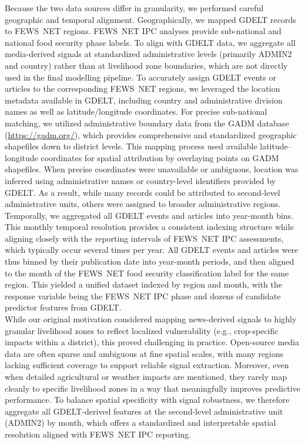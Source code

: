 \documentclass{article}
\begin{document}
Because the two data sources differ in granularity, we performed careful geographic and temporal alignment. Geographically, we mapped GDELT records to FEWS~NET regions. FEWS~NET IPC analyses provide sub-national and national food security phase labels. To align with GDELT data, we aggregate all media-derived signals at standardized administrative levels (primarily ADMIN2 and country) rather than at livelihood zone boundaries, which are not directly used in the final modelling pipeline. To accurately assign GDELT events or articles to the corresponding FEWS~NET regions, we leveraged the location metadata available in GDELT, including country and administrative division names as well as latitude/longitude coordinates. For precise sub-national matching, we utilized administrative boundary data from the GADM database (\url{https://gadm.org/}), which provides comprehensive and standardized geographic shapefiles down to district levels. This mapping process used available latitude–longitude coordinates for spatial attribution by overlaying points on GADM shapefiles. When precise coordinates were unavailable or ambiguous, location was inferred using administrative names or country-level identifiers provided by GDELT. As a result, while many records could be attributed to second-level administrative units, others were assigned to broader administrative regions. Temporally, we aggregated all GDELT events and articles into year-month bins. This monthly temporal resolution provides a consistent indexing structure while aligning closely with the reporting intervals of FEWS~NET IPC assessments, which typically occur several times per year. All GDELT events and articles were thus binned by their publication date into year-month periods, and then aligned to the month of the FEWS~NET food security classification label for the same region. This yielded a unified dataset indexed by region and month, with the response variable being the FEWS~NET IPC phase and dozens of candidate predictor features from GDELT.\\

While our original motivation considered mapping news-derived signals to highly granular livelihood zones to reflect localized vulnerability (e.g., crop-specific impacts within a district), this proved challenging in practice. Open-source media data are often sparse and ambiguous at fine spatial scales, with many regions lacking sufficient coverage to support reliable signal extraction. Moreover, even when detailed agricultural or weather impacts are mentioned, they rarely map cleanly to specific livelihood zones in a way that meaningfully improves predictive performance. To balance spatial specificity with signal robustness, we therefore aggregate all GDELT-derived features at the second-level administrative unit (ADMIN2) by month, which offers a standardized and interpretable spatial resolution aligned with FEWS~NET IPC reporting.
\end{document}
